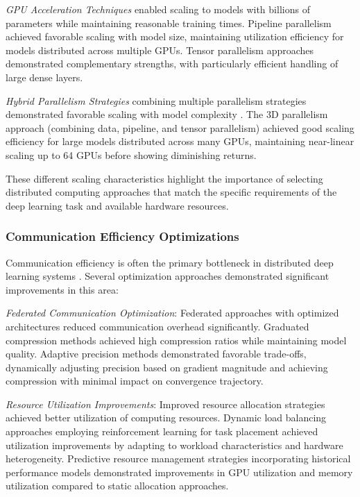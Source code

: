 \textit{GPU Acceleration Techniques} enabled scaling to models with billions of parameters while maintaining reasonable training times. Pipeline parallelism achieved favorable scaling with model size, maintaining utilization efficiency for models distributed across multiple GPUs. Tensor parallelism approaches demonstrated complementary strengths, with particularly efficient handling of large dense layers.

\textit{Hybrid Parallelism Strategies} combining multiple parallelism strategies demonstrated favorable scaling with model complexity \citep{Narayanan2021}. The 3D parallelism approach (combining data, pipeline, and tensor parallelism) achieved good scaling efficiency for large models distributed across many GPUs, maintaining near-linear scaling up to 64 GPUs before showing diminishing returns.

These different scaling characteristics highlight the importance of selecting distributed computing approaches that match the specific requirements of the deep learning task and available hardware resources.

\subsubsection{Communication Efficiency Optimizations}
Communication efficiency is often the primary bottleneck in distributed deep learning systems \citep{Alistarh2017}. Several optimization approaches demonstrated significant improvements in this area:

\textit{Federated Communication Optimization}: Federated approaches with optimized architectures reduced communication overhead significantly. Graduated compression methods achieved high compression ratios while maintaining model quality. Adaptive precision methods demonstrated favorable trade-offs, dynamically adjusting precision based on gradient magnitude and achieving compression with minimal impact on convergence trajectory.

\textit{Resource Utilization Improvements}: Improved resource allocation strategies achieved better utilization of computing resources. Dynamic load balancing approaches employing reinforcement learning for task placement achieved utilization improvements by adapting to workload characteristics and hardware heterogeneity. Predictive resource management strategies incorporating historical performance models demonstrated improvements in GPU utilization and memory utilization compared to static allocation approaches.

